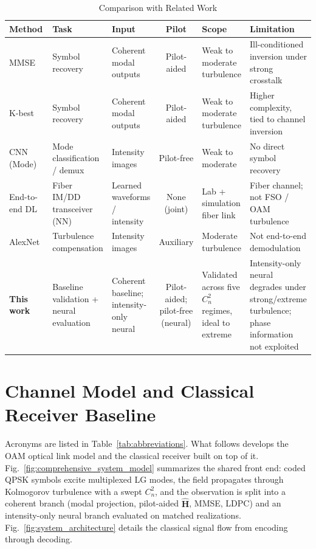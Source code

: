 \documentclass[journal]{IEEEtran}
\begin{document}
\begin{table}[!t]
\centering
\caption{Comparison with Related Work}
\label{tab:comparison}
\small
\setlength{\tabcolsep}{5pt}
\renewcommand{\arraystretch}{1.12}
\begin{tabularx}{\textwidth}{lXXcXX}
\toprule
\textbf{Method} & \textbf{Task} & \textbf{Input} & \textbf{Pilot} & \textbf{Scope} & \textbf{Limitation} \\
\midrule
MMSE~\cite{huang2014100} & Symbol recovery & Coherent modal outputs & Pilot-aided & Weak to moderate turbulence & Ill-conditioned inversion under strong crosstalk \\
K-best~\cite{ge2021oam} & Symbol recovery & Coherent modal outputs & Pilot-aided & Weak to moderate turbulence & Higher complexity, tied to channel inversion \\
CNN (Mode)~\cite{doster2017machine} & Mode classification / demux & Intensity images & Pilot-free & Weak to moderate & No direct symbol recovery \\
End-to-end DL~\cite{karanov2018endtoend} & Fiber IM/DD transceiver (NN) & Learned waveforms / intensity & None (joint) & Lab + simulation fiber link & Fiber channel; not FSO / OAM turbulence \\
AlexNet~\cite{zhao2020cnn} & Turbulence compensation & Intensity images & Auxiliary & Moderate turbulence & Not end-to-end demodulation \\
\midrule
\textbf{This work} & Baseline validation + neural evaluation & Coherent baseline; intensity-only neural & Pilot-aided; pilot-free (neural) & Validated across five $C_n^2$ regimes, ideal to extreme & Intensity-only neural degrades under strong/extreme turbulence; phase information not exploited \\
\bottomrule
\end{tabularx}
\end{table}

\section{Channel Model and Classical Receiver Baseline}
\label{sec:channel}

Acronyms are listed in Table~\ref{tab:abbreviations}. What follows develops the OAM optical link model and the classical receiver built on top of it. Fig.~\ref{fig:comprehensive_system_model} summarizes the shared front end: coded QPSK symbols excite multiplexed LG modes, the field propagates through Kolmogorov turbulence with a swept $C_n^2$, and the observation is split into a coherent branch (modal projection, pilot-aided $\hat{\mathbf{H}}$, MMSE, LDPC) and an intensity-only neural branch evaluated on matched realizations. Fig.~\ref{fig:system_architecture} details the classical signal flow from encoding through decoding.
\end{document}
